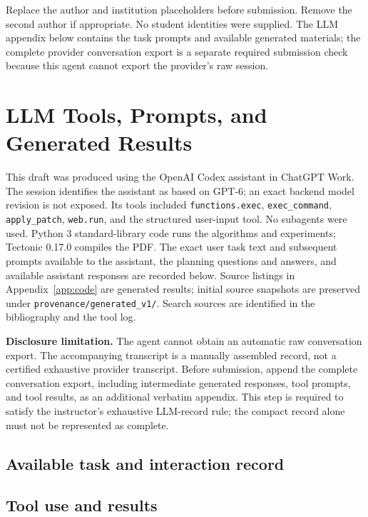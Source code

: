 \documentclass[sigconf,nonacm]{acmart}
\begin{document}
Replace the author and institution placeholders before submission. Remove
the second author if appropriate. No student identities were supplied. The
LLM appendix below contains the task prompts and available generated
materials; the complete provider conversation export is a separate required
submission check because this agent cannot export the provider's raw session.

\section{LLM Tools, Prompts, and Generated Results}
\label{app:llm}
This draft was produced using the OpenAI Codex assistant in ChatGPT Work.
The session identifies the assistant as based on GPT-6; an exact backend model
revision is not exposed. Its tools included \texttt{functions.exec},
\texttt{exec\_command}, \texttt{apply\_patch}, \texttt{web.run}, and the
structured user-input tool. No subagents were used. Python 3 standard-library
code runs the algorithms and experiments; Tectonic 0.17.0 compiles the PDF.
The exact user task text and subsequent prompts available to the assistant,
the planning questions and answers, and available assistant responses are
recorded below. Source listings in Appendix~\ref{app:code} are generated
results; initial source snapshots are preserved under
\texttt{provenance/generated\_v1/}. Search sources are identified in the
bibliography and the tool log.

\textbf{Disclosure limitation.} The agent cannot obtain an automatic raw
conversation export. The accompanying transcript is a manually assembled
record, not a certified exhaustive provider transcript. Before submission,
append the complete conversation export, including intermediate generated
responses, tool prompts, and tool results, as an additional verbatim appendix.
This step is required to satisfy the instructor's exhaustive LLM-record rule;
the compact record alone must not be represented as complete.

\subsection{Available task and interaction record}
\subsection{Tool use and results}
\end{document}
